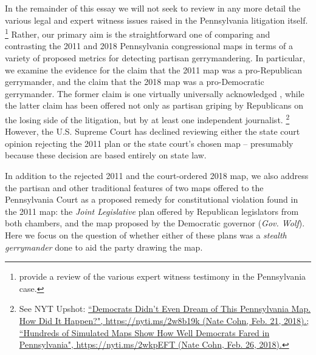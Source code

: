 \par
    In the remainder of this essay we will not seek to review in any more detail the various legal and expert witness issues raised in the Pennsylvania litigation itself.
        \footnote{\citet{Grofman_Cervas_2018_ELJ} provide a review of the various expert witness testimony in the Pennsylvania case.}
    Rather, our primary aim is the straightforward one of comparing and contrasting the 2011 and 2018 Pennsylvania congressional maps in terms of a variety of proposed metrics for detecting partisan gerrymandering. In particular, we examine the evidence for the claim that the 2011 map was a pro-Republican gerrymander, and the claim that the 2018 map was a pro-Democratic gerrymander. The former claim is one virtually universally acknowledged \citep{Fang2014, Mcgann_et_al_2015_ELJ, McGann_et_al_2016_gerrymandering, Wang2016_SLR, Wang2016_ELJ}, while the latter claim has been offered not only as partisan griping by Republicans on the losing side of the litigation, but by at least one independent journalist.
        \footnote{See NYT Upshot: \href{https://nyti.ms/2w8b19k}{``Democrats Didn’t Even Dream of This Pennsylvania Map. How Did It Happen?", https://nyti.ms/2w8b19k (Nate Cohn, Feb. 21, 2018).;} \\
        \href{https://nyti.ms/2wkpEFT}{``Hundreds of Simulated Maps Show How Well Democrats Fared in Pennsylvania", https://nyti.ms/2wkpEFT (Nate Cohn, Feb. 26, 2018).}}
    However, the U.S. Supreme Court has declined reviewing either the state court opinion rejecting the 2011 plan or the state court’s chosen map -- presumably because these decision are based entirely on state law.
\par
    In addition to the rejected 2011 and the court-ordered 2018 map, we also address the partisan and other traditional features of two maps offered to the Pennsylvania Court as a proposed remedy for constitutional violation found in the 2011 map: the \textit{Joint Legislative} plan offered by Republican legislators from both chambers, and the map proposed by the Democratic governor (\textit{Gov. Wolf}). Here we focus on the question of whether either of these plans was a \textit{stealth gerrymander} done to aid the party drawing the map.
